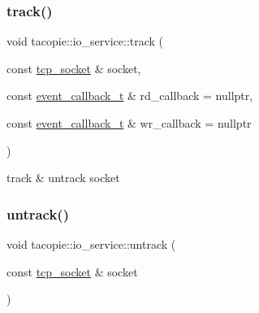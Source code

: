 \mbox{\label{classtacopie_1_1io__service_a9f4c8bce3c0f6d660515b0b5eb109df8}} 
\subsubsection{\texorpdfstring{track()}{track()}}
{\footnotesize\ttfamily void tacopie\+::io\+\_\+service\+::track (\begin{DoxyParamCaption}\item[{const \hyperlink{classtacopie_1_1tcp__socket}{tcp\+\_\+socket} \&}]{socket,  }\item[{const \hyperlink{classtacopie_1_1io__service_abb66850c32d9c724f4418d77bd04bcfd}{event\+\_\+callback\+\_\+t} \&}]{rd\+\_\+callback = {\ttfamily nullptr},  }\item[{const \hyperlink{classtacopie_1_1io__service_abb66850c32d9c724f4418d77bd04bcfd}{event\+\_\+callback\+\_\+t} \&}]{wr\+\_\+callback = {\ttfamily nullptr} }\end{DoxyParamCaption})}



track \& untrack socket 

\mbox{\label{classtacopie_1_1io__service_a9a7672f0894a0fc1a3e6c593ca6df22c}} 
\subsubsection{\texorpdfstring{untrack()}{untrack()}}
{\footnotesize\ttfamily void tacopie\+::io\+\_\+service\+::untrack (\begin{DoxyParamCaption}\item[{const \hyperlink{classtacopie_1_1tcp__socket}{tcp\+\_\+socket} \&}]{socket }\end{DoxyParamCaption})}

\mbox{\label{classtacopie_1_1io__service_aa57db619baeaa6db0aeb22e67b895cd7}} 
